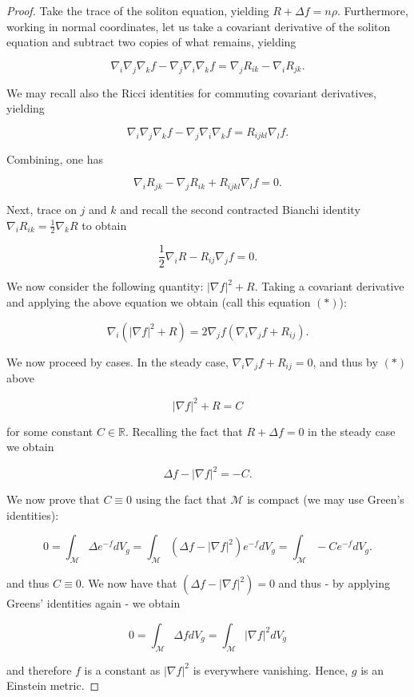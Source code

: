 \documentclass[openany, amssymb, psamsfonts]{amsart}
\theoremstyle{definition}
\numberwithin{equation}{section}
\begin{document}
\begin{proof}

Take the trace of the soliton equation, yielding $R + \Delta f = n\rho$. Furthermore, working in normal coordinates, let us take a covariant derivative of the soliton equation and subtract two copies of what remains, yielding

$$\nabla_i \nabla_j \nabla_k f - \nabla_j \nabla_i \nabla_k f = \nabla_j R_{ik} - \nabla_i R_{jk}.$$

We may recall also the Ricci identities for commuting covariant derivatives, yielding

$$\nabla_i \nabla_j \nabla_k f - \nabla_j \nabla_i \nabla_k f = R_{ijkl}\nabla_l f.$$

Combining, one has

$$\nabla_i R_{jk} - \nabla_j R_{ik} + R_{ijkl}\nabla_l f = 0.$$

Next, trace on $j$ and $k$ and recall the second contracted Bianchi identity $\nabla_i R_{ik} = \frac{1}{2} \nabla_k R$ to obtain

$$\frac{1}{2} \nabla_i R - R_{ij} \nabla_j f = 0.$$

We now consider the following quantity: $|\nabla f|^2 + R$. Taking a covariant derivative and applying the above equation we obtain (call this equation $(*)$):

$$\nabla_i(|\nabla f|^2 + R) = 2 \nabla_j f (\nabla_ i \nabla_j f + R_{ij}).$$

 We now proceed by cases. In the steady case, $\nabla_ i \nabla_j f + R_{ij} = 0$, and thus by $(*)$ above

 $$|\nabla f|^2 + R = C$$

for some constant $C \in \mathbb{R}$. Recalling the fact that $R + \Delta f = 0$ in the steady case we obtain

$$\Delta f - |\nabla f|^2 = -C.$$

We now prove that $C \equiv 0$ using the fact that $\mathcal{M}$ is compact (we may use Green's identities):

$$0 = \int_{\mathcal{M}} \Delta e^{-f} dV_g = \int_{\mathcal{M}}(\Delta f - |\nabla f|^2)e^{-f}dV_g =  \int_{\mathcal{M}} -C e^{-f}dV_g.$$

and thus $C \equiv 0$. We now have that $(\Delta f - |\nabla f|^2) = 0$ and thus - by applying Greens' identities again - we obtain

$$0 = \int_{\mathcal{M}} \Delta f dV_g = \int_{\mathcal{M}} |\nabla f|^2 dV_g$$

and therefore $f$ is a constant as $|\nabla f|^2$ is everywhere vanishing. Hence, $g$ is an Einstein metric.


\end{proof}
\end{document}
